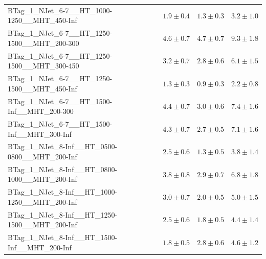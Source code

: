 \documentclass{beamer}
\begin{document}
\begin{frame}
\begin{tabular}{lrrr}
      BTag\_1\_NJet\_6-7\_\_HT\_1000-1250\_\_MHT\_450-Inf &               $1.9\pm0.4$&               $1.3\pm0.3$&                   $3.2\pm1.0$ \\
      BTag\_1\_NJet\_6-7\_\_HT\_1250-1500\_\_MHT\_200-300 &               $4.6\pm0.7$&               $4.7\pm0.7$&                   $9.3\pm1.8$ \\
      BTag\_1\_NJet\_6-7\_\_HT\_1250-1500\_\_MHT\_300-450 &               $3.2\pm0.7$&               $2.8\pm0.6$&                   $6.1\pm1.5$ \\
      BTag\_1\_NJet\_6-7\_\_HT\_1250-1500\_\_MHT\_450-Inf &               $1.3\pm0.3$&               $0.9\pm0.3$&                   $2.2\pm0.8$ \\
       BTag\_1\_NJet\_6-7\_\_HT\_1500-Inf\_\_MHT\_200-300 &               $4.4\pm0.7$&               $3.0\pm0.6$&                   $7.4\pm1.6$ \\
       BTag\_1\_NJet\_6-7\_\_HT\_1500-Inf\_\_MHT\_300-Inf &               $4.3\pm0.7$&               $2.7\pm0.5$&                   $7.1\pm1.6$ \\
    BTag\_1\_NJet\_8-Inf\_\_HT\_0500-0800\_\_MHT\_200-Inf &               $2.5\pm0.6$&               $1.3\pm0.5$&                   $3.8\pm1.4$ \\
    BTag\_1\_NJet\_8-Inf\_\_HT\_0800-1000\_\_MHT\_200-Inf &               $3.8\pm0.8$&               $2.9\pm0.7$&                   $6.8\pm1.8$ \\
    BTag\_1\_NJet\_8-Inf\_\_HT\_1000-1250\_\_MHT\_200-Inf &               $3.0\pm0.7$&               $2.0\pm0.5$&                   $5.0\pm1.5$ \\
    BTag\_1\_NJet\_8-Inf\_\_HT\_1250-1500\_\_MHT\_200-Inf &               $2.5\pm0.6$&               $1.8\pm0.5$&                   $4.4\pm1.4$ \\
     BTag\_1\_NJet\_8-Inf\_\_HT\_1500-Inf\_\_MHT\_200-Inf &               $1.8\pm0.5$&               $2.8\pm0.6$&                   $4.6\pm1.2$ \\

\bottomrule
\end{tabular}
\end{frame}
\end{document}

